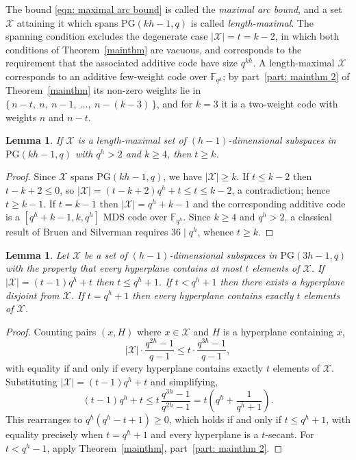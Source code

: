 \documentclass[12pt, twoside]{article}
\newtheorem{lemma}[theorem]{\bf Lemma}
\begin{document}
	The bound \eqref{eqn: maximal arc bound} is called the \emph{maximal arc bound}, and a set $\mathcal{X}$ attaining it which spans $\mathrm{PG}(kh-1,q)$ is called \emph{length-maximal}. The spanning condition excludes the degenerate case $|\mathcal{X}|=t=k-2$, in which both conditions of Theorem~\ref{mainthm} are vacuous, and corresponds to the requirement that the associated additive code have size $q^{kh}$. A length-maximal $\mathcal{X}$ corresponds to an additive few-weight code over ${\mathbb F}_{q^h}$; by part~\ref{part: mainthm 2} of Theorem~\ref{mainthm} its non-zero weights lie in $\{\,n-t,\ n,\ n-1,\ \ldots,\ n-(k-3)\,\}$, and for $k=3$ it is a two-weight code with weights $n$ and $n-t$.
	
	\begin{lemma}\label{lem: no maximal MDS codes}
		If $\mathcal{X}$ is a length-maximal set of $(h-1)$-dimensional subspaces in $\mathrm{PG}(kh-1, q)$ with $q^h>2$ and $k\ge 4$, then $t\ge k$.
	\end{lemma}
	
	\begin{proof}
		Since $\mathcal{X}$ spans $\mathrm{PG}(kh-1,q)$, we have $|\mathcal{X}| \ge k$. If $t \le k-2$ then $t-k+2 \le 0$, so $|\mathcal{X}| = (t-k+2)q^h+t \le t \le k-2$, a contradiction; hence $t \ge k-1$. If $t=k-1$ then $|\mathcal{X}|=q^h+k-1$ and the corresponding additive code is a $[q^h+k-1,k,q^h]$ MDS code over $\mathbb{F}_{q^h}$. Since $k \ge 4$ and $q^h>2$, a classical result of Bruen and Silverman \cite[Theorem~6]{MR704102} requires $36 \mid q^h$, whence $t \ge k$.
	\end{proof}
	
	\begin{lemma} \label{lem: single weight bound k=3}
		Let $\mathcal{X}$ be a set of $(h-1)$-dimensional subspaces in $\mathrm{PG}(3h-1, q)$ with the property that every hyperplane contains at most $t$ elements of $\mathcal{X}$. If $|\mathcal{X}| = (t - 1)q^h + t$ then $t\leq q^h+1$. If $t < q^h + 1$ then there exists a hyperplane disjoint from $\mathcal{X}$. If $t = q^h + 1$ then every hyperplane contains exactly $t$ elements of $\mathcal{X}$.
	\end{lemma}
	
	\begin{proof}
		Counting pairs $(x, H)$ where $x \in \mathcal{X}$ and $H$ is a hyperplane containing $x$,
		$$
		|\mathcal{X}| \cdot \frac{q^{2h}-1}{q-1} \le t \cdot \frac{q^{3h}-1}{q-1},
		$$
		with equality if and only if every hyperplane contains exactly $t$ elements of $\mathcal{X}$. Substituting $|\mathcal{X}|=(t-1)q^h+t$ and simplifying,
		$$
		(t-1)q^h+t \leq t\,\frac{q^{3h}-1}{q^{2h}-1} = t\left(q^h + \frac{1}{q^h+1}\right).
		$$
		This rearranges to $q^h(q^h-t+1) \ge 0$, which holds if and only if $t \le q^h+1$, with equality precisely when $t=q^h+1$ and every hyperplane is a $t$-secant. For $t<q^h-1$, apply Theorem~\ref{mainthm},  part~\ref{part: mainthm 2}.
	\end{proof}
	
\end{document}
